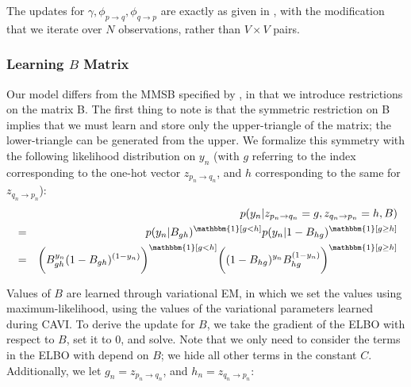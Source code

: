 The updates for $\gamma, \phi_{p \rightarrow q}, \phi_{q \rightarrow p}$ are exactly as given in \cite{airoldi:2008}, with the modification that we iterate over $N$ observations, rather than $V \times V$ pairs.

\subsubsection{Learning $B$ Matrix }

Our model differs from the MMSB specified by \cite{airoldi:2008} , in that we introduce restrictions on the matrix B.
The first thing to note is that the symmetric restriction on B implies that we must learn and store only the upper-triangle of the matrix; the lower-triangle can be generated from the upper.
We formalize this symmetry with the following likelihood distribution on $y_n$ (with $g$ referring to the index corresponding to the one-hot vector $z_{p_n \rightarrow q_n}$, and $h$ corresponding to the same for $z_{q_n \rightarrow p_n}$):
\begin{eqnarray*}
&& p(y_n | z_{p_n \rightarrow q_n} = g, z_{q_n \rightarrow p_n} = h, B) \\
&=& p(y_n | B_{gh})^{\mathbbm{1}[g < h]}p(y_n | 1 - B_{hg})^{\mathbbm{1}[g \geq h]} \\
&=& \bigg(B_{gh}^{y_n}(1-B_{gh})^{(1-y_n)}\bigg)^{\mathbbm{1}[g < h]} \bigg((1-B_{hg})^{y_n}B_{hg}^{(1-y_n)}\bigg)^{\mathbbm{1}[g \geq h]}
\end{eqnarray*}

Values of $B$ are learned through variational EM, in which we set the values using maximum-likelihood, using the values of the variational parameters learned during CAVI.
To derive the update for $B$, we take the gradient of the ELBO with respect to $B$, set it to $0$, and solve.
Note that we only need to consider the terms in the ELBO with depend on $B$; we hide all other terms in the constant $C$.
Additionally, we let $g_n = z_{p_n \rightarrow q_n}$, and $h_n = z_{q_n \rightarrow p_n}$:

